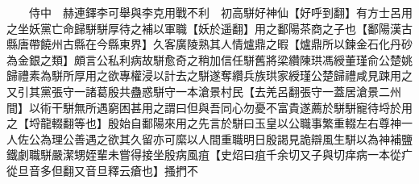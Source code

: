 　　侍中　赫連鐸李可舉與李克用戰不利　初高駢好神仙【好呼到翻】有方士呂用之坐妖黨亡命歸駢駢厚待之補以軍職【妖於遥翻】用之鄱陽茶商之子也【鄱陽漢古縣唐帶饒州古縣在今縣東界】久客廣陵熟其人情爐鼎之暇【爐鼎所以鍊金石化丹砂為金銀之類】頗言公私利病故駢愈奇之稍加信任駢舊將梁纘陳珙馮綬董瑾俞公楚姚歸禮素為駢所厚用之欲專權浸以計去之駢遂奪纘兵族珙家綬瑾公楚歸禮咸見踈用之又引其黨張守一諸葛殷共蠱惑駢守一本滄景村民【去羌呂翻張守一蓋居滄景二州間】以術干駢無所遇窮困甚用之謂曰但與吾同心勿憂不富貴遂薦於駢駢寵待埒於用之【埒龍輟翻等也】殷始自鄱陽來用之先言於駢曰玉皇以公職事繁重輟左右尊神一人佐公為理公善遇之欲其久留亦可縻以人間重職明日殷謁見詭辯風生駢以為神補鹽鐵劇職駢嚴潔甥姪輩未嘗得接坐殷病風疽【史炤曰疽千余切又子與切痒病一本從疒從旦音多但翻又音旦釋云瘡也】搔捫不